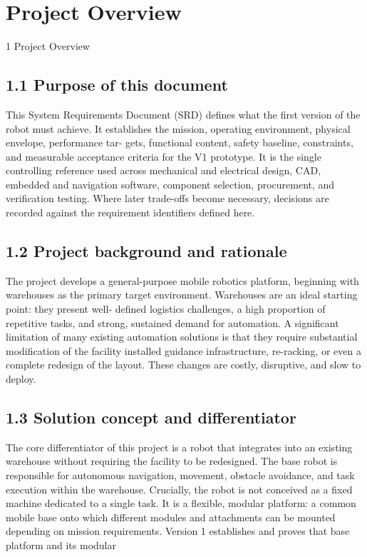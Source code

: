 \chapter{Project Overview}

1 Project Overview

\section*{1.1 Purpose of this document}

This System Requirements Document (SRD) defines what the first version of the robot must achieve. It establishes the mission, operating environment, physical envelope, performance tar- gets, functional content, safety baseline, constraints, and measurable acceptance criteria for the V1 prototype. It is the single controlling reference used across mechanical and electrical design, CAD, embedded and navigation software, component selection, procurement, and verification testing. Where later trade-offs become necessary, decisions are recorded against the requirement identifiers defined here.

\section*{1.2 Project background and rationale}

The project develops a general-purpose mobile robotics platform, beginning with warehouses as the primary target environment. Warehouses are an ideal starting point: they present well- defined logistics challenges, a high proportion of repetitive tasks, and strong, sustained demand for automation. A significant limitation of many existing automation solutions is that they require substantial modification of the facility installed guidance infrastructure, re-racking, or even a complete redesign of the layout. These changes are costly, disruptive, and slow to deploy.

\section*{1.3 Solution concept and differentiator}

The core differentiator of this project is a robot that integrates into an existing warehouse without requiring the facility to be redesigned. The base robot is responsible for autonomous navigation, movement, obstacle avoidance, and task execution within the warehouse. Crucially, the robot is not conceived as a fixed machine dedicated to a single task. It is a flexible, modular platform: a common mobile base onto which different modules and attachments can be mounted depending on mission requirements. Version 1 establishes and proves that base platform and its modular

